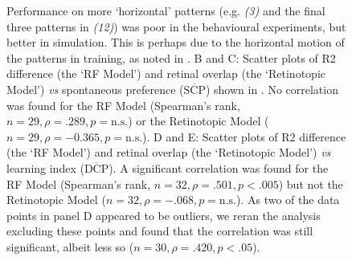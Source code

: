 \begin{figure}[htp]
{Performance on more `horizontal' patterns (e.g. \emph{(3)} and the final three patterns in \emph{(12)}) was poor in the behavioural experiments, but better in simulation.
This is perhaps due to the horizontal motion of the patterns in training, as noted in \protect\cite{Ernst1999}.
B and C: Scatter plots of R2 difference (the `RF Model') and retinal overlap (the `Retinotopic Model') \emph{vs} spontaneous preference ($\overline{\mathrm{SCP}}$) shown in \protect\cite{Ernst1999}.
No correlation was found for the RF Model (Spearman's rank, $n=29, \rho=.289, p=\mathrm{n.s.}$) or the Retinotopic Model ($n=29, \rho= -0.365, p=\mathrm{n.s.}$).
D and E: Scatter plots of R2 difference (the `RF Model') and retinal overlap (the `Retinotopic Model') \emph{vs} learning index ($\overline{\mathrm{DCP}}$).
A significant correlation was found for the RF Model (Spearman's rank, $n=32, \rho=.501, p < .005$) but not the Retinotopic Model ($n=32, \rho=-.068,p=\mathrm{n.s.}$).
As two of the data points in panel D appeared to be outliers, we reran the analysis excluding these points and found that the correlation was still significant, albeit less so ($n=30, \rho=.420, p < .05$).}
\label{fig:pattern}
\end{figure}

